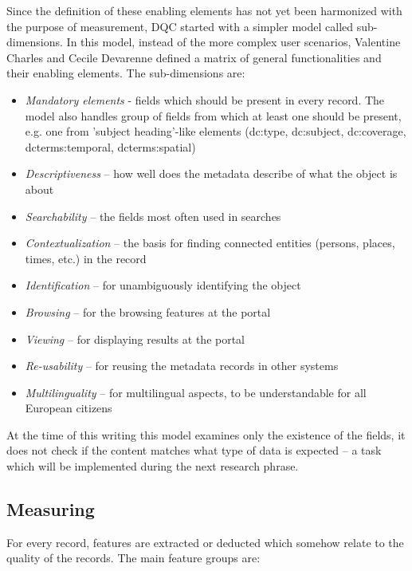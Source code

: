 Since the definition of these enabling elements has not yet been harmonized with the purpose of measurement, DQC started with a simpler model called sub-dimensions. In this model, instead of the more complex user scenarios, Valentine Charles and Cecile Devarenne defined a matrix of general functionalities and their enabling elements. The sub-dimensions are:

\begin{itemize}
 \setlength{\parskip}{0pt}
 \setlength{\itemsep}{0pt plus 1pt}
\item \emph{Mandatory elements} - fields which should be present in every record. The model also handles group of fields from which at least one should be present, e.g. one from 'subject heading'-like elements (dc:type, dc:subject, dc:coverage, dcterms:temporal, dcterms:spatial)
\item \emph{Descriptiveness} – how well does the metadata describe of what the object is about
\item \emph{Searchability} – the fields most often used in searches
\item \emph{Contextualization} – the basis for finding connected entities (persons, places, times, etc.) in the record
\item \emph{Identification} – for unambiguously identifying the object
\item \emph{Browsing} – for the browsing features at the portal
\item \emph{Viewing} – for displaying results at the portal
\item \emph{Re-usability} – for reusing the metadata records in other systems
\item \emph{Multilinguality} – for multilingual aspects, to be understandable for all European citizens
\end{itemize}

At the time of this writing this model examines only the existence of the fields, it does not check if the content matches what type of data is expected -- a task which will be implemented during the next research phrase.

\subsection{Measuring}

For every record, features are extracted or deducted which somehow relate to the quality of the records. The main feature groups are:

